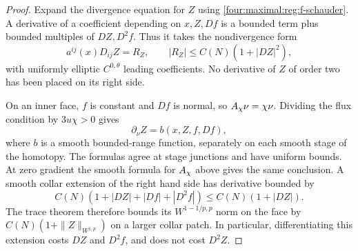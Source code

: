 \begin{proof}
Expand the divergence equation for $Z$ using
\eqref{four:maximal:reg:f-schauder}.  A derivative of a coefficient depending on
$x,Z,Df$ is a bounded term plus bounded multiples of $DZ,D^2f$.
Thus it takes the nondivergence form
\begin{equation}\label{four:maximal:reg:Z-nondivergence}
 a^{ij}(x)D_{ij}Z=R_Z,\qquad
 |R_Z|\le C(N)(1+|DZ|^2),
\end{equation}
with uniformly elliptic $C^{0,\theta}$ leading coefficients.  No
derivative of $Z$ of order two has been placed on its right side.

On an inner face, $f$ is constant and $Df$ is normal, so
$A_\chi\nu=\chi\nu$.  Dividing the flux condition by $3u\chi>0$
gives
\begin{equation}\label{four:maximal:reg:normal-datum}
 \partial_\nu Z=b(x,Z,f,Df),
\end{equation}
where $b$ is a smooth bounded-range function, separately on each
smooth stage of the homotopy.  The formulas agree at stage junctions
and have uniform bounds.  At zero gradient the smooth formula for
$A_\chi$ above gives the same conclusion.  A smooth collar
extension of the right hand side has derivative bounded by
\[
 C(N)(1+|DZ|+|Df|+|D^2f|)
                         \le C(N)(1+|DZ|).
\]
The trace theorem therefore bounds its
$W^{1-1/p,p}$ norm on the face by
$C(N)(1+\|Z\|_{W^{1,p}})$ on a larger collar patch.  In particular,
differentiating this extension costs $DZ$ and $D^2f$, and does not
cost $D^2Z$.


\end{proof}
